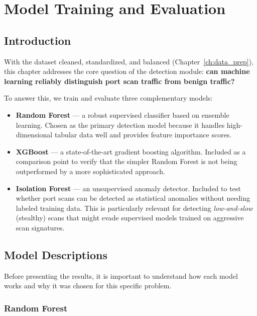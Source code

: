 
\chapter{Model Training and Evaluation}\label{ch:model_training}

\section{Introduction}

With the dataset cleaned, standardized, and balanced (Chapter~\ref{ch:data_prep}), this chapter addresses the core question of the detection module: \textbf{can machine learning reliably distinguish port scan traffic from benign traffic?}

To answer this, we train and evaluate three complementary models:

\begin{itemize}
    \item \textbf{Random Forest} --- a robust supervised classifier based on ensemble learning. Chosen as the primary detection model because it handles high-dimensional tabular data well and provides feature importance scores.
    \item \textbf{XGBoost} --- a state-of-the-art gradient boosting algorithm. Included as a comparison point to verify that the simpler Random Forest is not being outperformed by a more sophisticated approach.
    \item \textbf{Isolation Forest} --- an unsupervised anomaly detector. Included to test whether port scans can be detected as statistical anomalies without needing labeled training data. This is particularly relevant for detecting \textit{low-and-slow} (stealthy) scans that might evade supervised models trained on aggressive scan signatures.
\end{itemize}

\section{Model Descriptions}

Before presenting the results, it is important to understand how each model works and why it was chosen for this specific problem.

\subsection{Random Forest}

